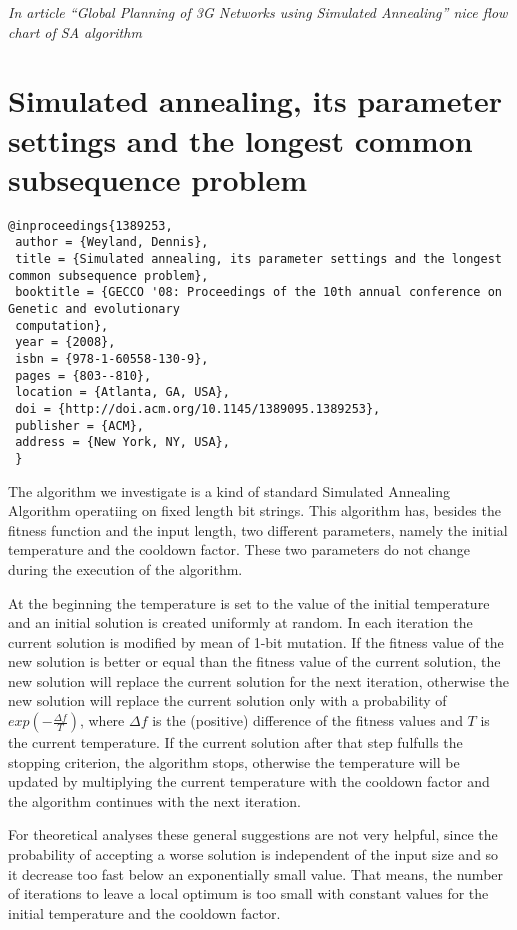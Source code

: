 \documentclass[pdftex,11pt]{article}
\begin{document}
\emph{In article ``Global Planning of 3G Networks using Simulated Annealing'' nice flow chart of SA algorithm}

\section*{Simulated annealing, its parameter settings and the longest common subsequence problem}
\begin{verbatim}
@inproceedings{1389253,
 author = {Weyland, Dennis},
 title = {Simulated annealing, its parameter settings and the longest common subsequence problem},
 booktitle = {GECCO '08: Proceedings of the 10th annual conference on Genetic and evolutionary 
 computation},
 year = {2008},
 isbn = {978-1-60558-130-9},
 pages = {803--810},
 location = {Atlanta, GA, USA},
 doi = {http://doi.acm.org/10.1145/1389095.1389253},
 publisher = {ACM},
 address = {New York, NY, USA},
 }
\end{verbatim}

The algorithm we investigate is a kind of standard Simulated Annealing Algorithm operatiing on fixed length bit strings. This algorithm has, besides the fitness function and the input length, two different parameters, namely the initial temperature and the cooldown factor. These two parameters do not change during the execution of the algorithm.

At the beginning the temperature is set to the value of the initial temperature and an initial solution is created uniformly at random. In each iteration the current solution is modified by mean of 1-bit mutation. If the fitness value of the new solution is better or equal than the fitness value of the current solution, the new solution will replace the current solution for the next iteration, otherwise the new solution will replace the current solution only with a probability of $exp(-\frac{\Delta f}{T})$, where $\Delta f$ is the (positive) difference of the fitness values and $T$ is the current temperature. If the current solution after that step fulfulls the stopping criterion, the algorithm stops, otherwise the temperature will be updated by multiplying the current temperature with the cooldown factor and the algorithm continues with the next iteration.

For theoretical analyses these general suggestions are not very helpful, since the probability of accepting a worse solution is independent of the input size and so it decrease too fast below an exponentially small value. That means, the number of iterations to leave a local optimum is too small with constant values for the initial temperature and the cooldown factor.
\end{document}
